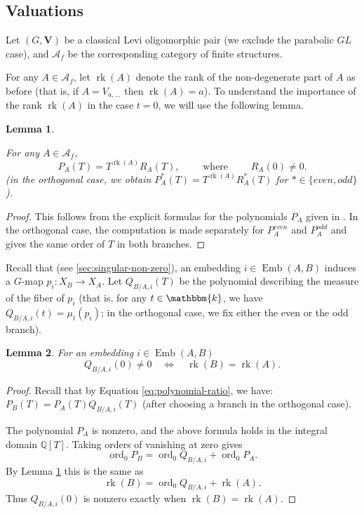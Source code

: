 \documentclass[11pt,a4paper]{amsart}
\theoremstyle{plain}%
\newtheorem{lemma}{Lemma}[subsection]
\theoremstyle{definition}
\theoremstyle{remark}
\newcommand{\rk}{{\operatorname{rk}}}
\newcommand{\V}{\mathbf{V}}
\newcommand{\kk}{\mathbbm{k}}
\newcommand{\Emb}{\operatorname{Emb}}
\newcommand{\ord}{\operatorname{ord}}
\begin{document}
\subsection{Valuations} \label{sec:valuations}
Let $(G, \V)$ be a classical Levi oligomorphic pair (we exclude the parabolic $GL$ case), and $\mathcal{A}_f$ be the corresponding category of finite structures. 

For any $A\in \mathcal{A}_f$, let $\rk(A)$ denote the rank of the non-degenerate part of $A$ as before (that is, if $A=V_{a,\ldots}$ then $\rk(A)=a$). To understand the importance of the rank $
\rk(A)$ in the case $t=0$, we will use the following lemma.
\begin{lemma}\label{lem:valuation}
 

For any $A\in \mathcal{A}_f$,
\[
 P_A(T)=T^{\rk(A)}R_A(T),\qquad\text{ where } \qquad R_A(0)\neq0.
\]
(in the orthogonal case, we obtain $P_A^{*}(T)=T^{\rk(A)}R_A^{*}(T)$ for $*\in \{even, odd\}$).
\end{lemma}



\begin{proof} This follows from the explicit formulas for the polynomials $P_A$ given in \cite[Proposition~6.3, Proposition~8.3, Proposition~9.5, Proposition~10.4]{HS-classical}. In the orthogonal case, the computation is made separately for $P_A^{even}$ and $P_A^{odd}$ and gives the same order of $T$ in both branches.


\end{proof}


Recall that {(see \cref{sec:singular-non-zero})}, an embedding $i\in \Emb(A, B)$ induces a $G$-map $ p_i:X_B\longrightarrow X_A.$
Let $Q_{B/A,i}(T)$ be the polynomial describing the measure of the fiber of $p_i$ (that is, for any $t\in \kk$, we have $Q_{B/A,i}(t)=\mu_t(p_i)$; in the orthogonal case, we fix either the even or the odd branch). 

\begin{lemma}\label{lem:zero-fibre}
For an embedding $i\in \Emb(A, B)$
\[
 Q_{B/A,i}(0)\ne0
 \quad\Longleftrightarrow\quad
 \rk(B)=\rk(A).
\]
\end{lemma}

\begin{proof}
Recall that by Equation \eqref{eq:polynomial-ratio}, we have: $ P_B(T)=P_A(T)Q_{B/A,i}(T)
$ (after choosing a branch in the orthogonal case).

The polynomial $P_A$ is nonzero, and the above formula holds in the integral domain $\mathbb Q[T]$. Taking orders of vanishing at zero gives
\[
 \ord_0 P_B=\ord_0 Q_{B/A,i}+\ord_0 P_A.
\]
By Lemma \ref{lem:valuation} this is the same as
\[
 \rk(B)=\ord_0 Q_{{B}/A,i}+\rk(A).
\]
Thus $Q_{B/A,i}(0)$ is nonzero exactly when $\rk(B)=\rk(A)$.
\end{proof}
\end{document}
